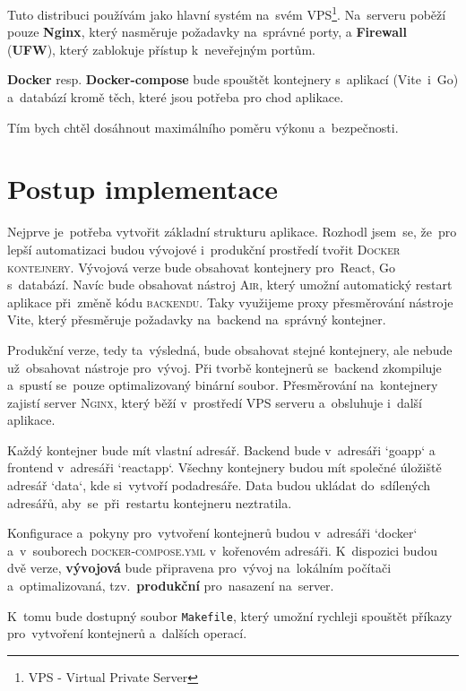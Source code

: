 \documentclass[14pt,a4paper]{article}
\begin{document}
            Tuto distribuci používám jako hlavní systém na~svém VPS\footnote{VPS - Virtual Private Server}.
            Na~serveru poběží pouze \textbf{Nginx}, který nasměruje požadavky na~správné porty, a \textbf{Firewall} (\textbf{UFW}), který zablokuje přístup k~neveřejným portům.

            \textbf{Docker} resp. \textbf{Docker-compose} bude spouštět kontejnery s~aplikací (Vite~i~Go) a~databází
            kromě těch, které jsou potřeba pro chod aplikace.

            Tím bych chtěl dosáhnout maximálního poměru výkonu a~bezpečnosti.
	
	\section{Postup implementace}
        Nejprve je~potřeba vytvořit základní strukturu aplikace. Rozhodl jsem~se, že~pro lepší automatizaci budou vývojové i~produkční prostředí tvořit \textsc{Docker kontejnery}.
        Vývojová verze bude obsahovat kontejnery pro~React, Go s~databází. Navíc bude obsahovat nástroj \textsc{Air}, který umožní automatický restart aplikace při~změně kódu \textsc{backendu}. Taky využijeme proxy přesměrování nástroje Vite, který přesměruje požadavky na~backend na~správný kontejner.

        Produkční verze, tedy ta~výsledná, bude obsahovat stejné kontejnery, ale nebude už~obsahovat nástroje pro~vývoj. Při tvorbě kontejnerů se~backend zkompiluje a~spustí se~pouze optimalizovaný binární soubor.
        Přesměrování na~kontejnery zajistí server \textsc{Nginx}, který běží v~prostředí VPS serveru a~obsluhuje i~další aplikace.

        Každý kontejner bude mít vlastní adresář. Backend bude v~adresáři `goapp` a frontend v~adresáři `reactapp`. Všechny kontejnery budou mít společné úložiště adresář `data`, kde si~vytvoří podadresáře. Data budou ukládat do~sdílených adresářů, aby~se~při~restartu kontejneru neztratila.

        Konfigurace a~pokyny pro~vytvoření kontejnerů budou v~adresáři `docker` a~v~souborech \textsc{docker-compose.yml} v~kořenovém adresáři. K~dispozici budou dvě verze, \textbf{vývojová} bude připravena pro~vývoj na~lokálním počítači a~optimalizovaná, tzv.~\textbf{produkční} pro~nasazení na~server.

        K~tomu bude dostupný soubor \texttt{Makefile}, který umožní rychleji spouštět příkazy pro~vytvoření kontejnerů a~dalších operací.
\end{document}
